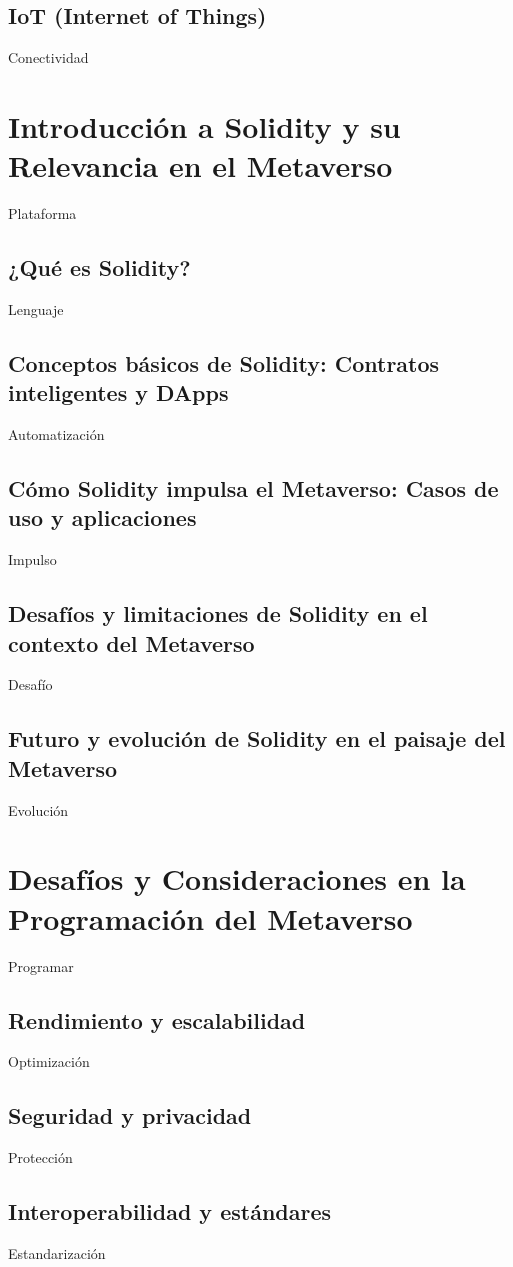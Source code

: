 \documentclass[a4paper,10pt]{article}
\begin{document}
	\subsection{IoT (Internet of Things)}
	Conectividad
	
	\section{Introducción a Solidity y su Relevancia en el Metaverso}
	Plataforma
	\subsection{¿Qué es Solidity?}
	Lenguaje
	\subsection{Conceptos básicos de Solidity: Contratos inteligentes y DApps}
	Automatización
	\subsection{Cómo Solidity impulsa el Metaverso: Casos de uso y aplicaciones}
	Impulso
	\subsection{Desafíos y limitaciones de Solidity en el contexto del Metaverso}
	Desafío
	\subsection{Futuro y evolución de Solidity en el paisaje del Metaverso}
	Evolución
	
	\section{Desafíos y Consideraciones en la Programación del Metaverso}
	Programar
	\subsection{Rendimiento y escalabilidad}
	Optimización
	\subsection{Seguridad y privacidad}
	Protección
	\subsection{Interoperabilidad y estándares}
	Estandarización
\end{document}

